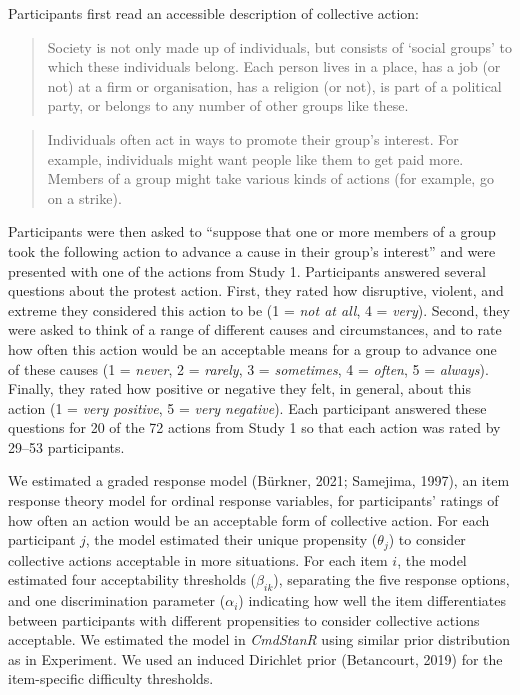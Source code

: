 \documentclass[12pt, letterpaper]{article}
\begin{document}
Participants first read an accessible description of collective action:

\begin{quote}
Society is not only made up of individuals, but consists of `social
groups' to which these individuals belong. Each person lives in a place,
has a job (or not) at a firm or organisation, has a religion (or not),
is part of a political party, or belongs to any number of other groups
like these.
\end{quote}

\begin{quote}
Individuals often act in ways to promote their group's interest. For
example, individuals might want people like them to get paid more.
Members of a group might take various kinds of actions (for example, go
on a strike).
\end{quote}

\noindent Participants were then asked to ``suppose that one or more
members of a group took the following action to advance a cause in their
group's interest'' and were presented with one of the actions from Study
1. Participants answered several questions about the protest action.
First, they rated how disruptive, violent, and extreme they considered
this action to be (1 = \emph{not at all}, 4 = \emph{very}). Second, they
were asked to think of a range of different causes and circumstances,
and to rate how often this action would be an acceptable means for a
group to advance one of these causes (1 = \emph{never}, 2 =
\emph{rarely}, 3 = \emph{sometimes}, 4 = \emph{often}, 5 =
\emph{always}). Finally, they rated how positive or negative they felt,
in general, about this action (1 = \emph{very positive}, 5 = \emph{very
negative}). Each participant answered these questions for 20 of the 72
actions from Study 1 so that each action was rated by 29--53
participants.

We estimated a graded response model (Bürkner, 2021; Samejima, 1997), an
item response theory model for ordinal response variables, for
participants' ratings of how often an action would be an acceptable form
of collective action. For each participant \(j\), the model estimated
their unique propensity (\(\theta_j\)) to consider collective actions
acceptable in more situations. For each item \(i\), the model estimated
four acceptability thresholds (\(\beta_{ik}\)), separating the five
response options, and one discrimination parameter (\(\alpha_i\))
indicating how well the item differentiates between participants with
different propensities to consider collective actions acceptable. We
estimated the model in \emph{CmdStanR} using similar prior distribution
as in Experiment. We used an induced Dirichlet prior (Betancourt, 2019)
for the item-specific difficulty thresholds.
\end{document}
